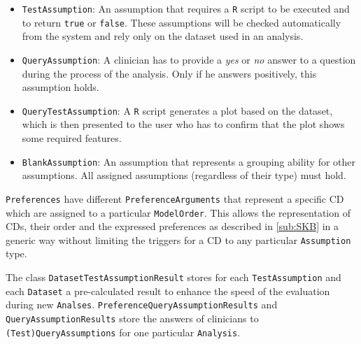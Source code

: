 \bigskip

\begin{itemize}

	\item \texttt{TestAssumption}: An assumption that requires a \texttt{R} script to be executed and to return \texttt{true} or \texttt{false}. These assumptions will be checked automatically from the system and rely only on the dataset used in an analysis.
	\item \texttt{QueryAssumption}: A clinician has to provide a \textit{yes} or \textit{no} answer to a question during the process of the analysis. Only if he answers positively, this assumption holds.
	\item \texttt{QueryTestAssumption}: A \texttt{R} script generates a plot based on the dataset, which is then presented to the user who has to confirm that the plot shows some required features.
	\item \texttt{BlankAssumption}: An assumption that represents a grouping ability for other assumptions. All assigned assumptions (regardless of their type) must hold. 
\end{itemize}
\bigskip


\texttt{Preferences} have different \texttt{PreferenceArguments} that represent a specific \gls{CD} which are assigned to a particular \texttt{ModelOrder}. This allows the representation of \glspl{CD}, their order and the expressed preferences as described in \autoref{sub:SKB} in a generic way without limiting the triggers for a \gls{CD} to any particular \texttt{Assumption} type. 

The class \texttt{DatasetTestAssumptionResult} stores for each \texttt{TestAssumption} and each \texttt{Dataset} a pre-calculated result to enhance the speed of the evaluation during new \texttt{Analses}. \texttt{PreferenceQueryAssumptionResults} and \texttt{QueryAssumptionResults} store the answers of clinicians to \texttt{(Test)QueryAssumptions} for one particular \texttt{Analysis}.

